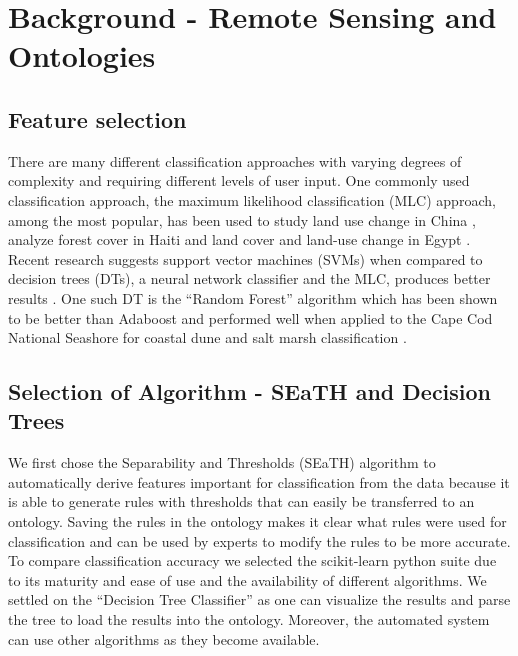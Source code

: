 \documentclass[authoryear, review,12pt,number]{elsarticle}
\begin{document}
\section{Background - Remote Sensing and Ontologies}

\subsection{Feature selection}
There are many different classification approaches with varying degrees of
complexity and requiring different levels of user input. One commonly used
classification approach, the maximum likelihood classification (MLC) approach,
among the most popular, has been used to study land use change in China
\citep{Ding2007}, analyze forest cover in Haiti \citep{Churches2014} and land
cover and land-use change in Egypt \citep{Shalaby2007}. Recent research suggests
support vector machines (SVMs) when compared to decision trees (DTs), a neural
network classifier and the MLC, produces better results \citep{Huang2002}. One
such DT is the ``Random Forest'' algorithm which has been shown to be better
than Adaboost \citep{Chan2008} and performed well when applied to the Cape Cod
National Seashore for coastal dune and salt marsh classification
\citep{Timm2012}.
\subsection{Selection of Algorithm - SEaTH and Decision Trees}
We first chose the Separability and Thresholds
(SEaTH) \citep{Nussbaum2006} algorithm to automatically derive features important
for classification from the data because it is able to generate rules with
thresholds that can easily be transferred to an ontology. Saving the rules in
the ontology makes it clear what rules were used for classification and can be
used by experts to modify the rules to be more accurate. To compare
classification accuracy we selected the scikit-learn python suite
\citep{scikit-learn} due to its maturity and ease of use and the availability of
different algorithms. We settled on the ``Decision Tree Classifier'' as one can
visualize the results and parse the tree to load the results into the ontology.
Moreover, the automated system can use other algorithms as they become available.
\end{document}
